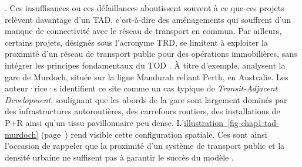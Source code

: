 \begin{refsegment}
{} \textcolor{blue}{\autocites[358]{lund_reasons_2006}[3]{renne_transit-adjacent_2009}}. Ces insuffisances ou ces défaillances aboutissent souvent à ce que ces projets relèvent davantage d’un \acrfull{TAD}, c’est-à-dire des aménagements qui souffrent d'un manque de connectivité avec le réseau de transport en commun. Par ailleurs, certains projets, désignés sous l’acronyme \acrfull{TRD}, se limitent à exploiter la proximité d’un réseau de transport public pour des opérations immobilières, sans intégrer les principes fondamentaux du \acrshort{TOD} \textcolor{blue}{\autocite[18]{bentayou_transit-oriented_2015}}. À titre d’exemple, \textcolor{blue}{\textcite[18]{khan_parking_2009}} analysent la gare de Murdoch, située sur la ligne Mandurah reliant Perth, en Australie. Les auteur·rice·s identifient ce site comme un cas typique de \textsl{Transit-Adjacent Development}, soulignant que les abords de la gare sont largement dominés par des infrastructures autoroutières, des carrefours routiers, des installations de \acrfull{P+R} ainsi qu’un tissu pavillonnaire peu dense. L'\hyperref[fig-chap1:tad-murdoch]{illustration~\ref{fig-chap1:tad-murdoch}} (page~\pageref{fig-chap1:tad-murdoch}) rend visible cette configuration spatiale. Ces  sont ainsi l'occasion de rappeler que la proximité d’un système de transport public et la densité urbaine ne suffisent pas à garantir le succès du modèle \textcolor{blue}{\autocite[18]{bentayou_transit-oriented_2015}}.%


\end{refsegment}
